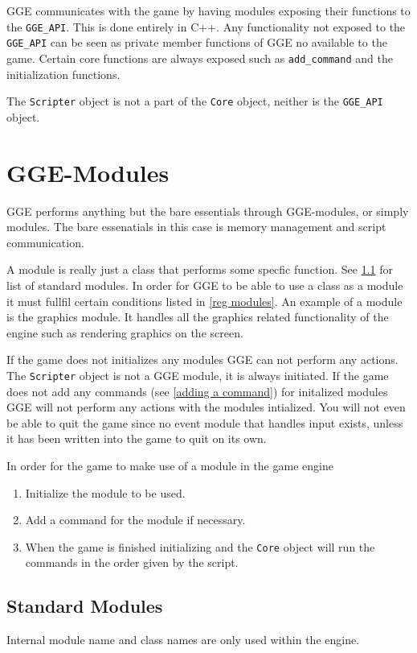GGE communicates with the game by having modules exposing their functions to the \verb|GGE_API|. This is done entirely
in C++. Any functionality not exposed to the \verb|GGE_API| can be seen as private member functions of GGE no
available to the game.
Certain core functions are always exposed such as \verb|add_command| and the initialization functions.

The \verb|Scripter| object is not a part of the \verb|Core| object, neither is the \verb|GGE_API| object.

\section{GGE-Modules} \label{inner modules}
GGE performs anything but the bare essentials through GGE-modules, or simply modules. The bare essenatials in this case is memory management and script communication.

A module is really just a class that performs some specfic function. See \ref{standard modules} for list of standard modules.
In order for GGE to be able to use a class as a module it must fullfil certain conditions listed in \ref{reg modules}.
An example of a module is the graphics module. It handles all the graphics related functionality of the engine such as rendering graphics on the screen.

If the game does not initializes any modules GGE can not perform any actions. The \verb|Scripter| object is not a GGE module, it is always initiated.
If the game does not add any commands (see \ref{adding a command}) for initalized modules GGE will not perform any actions with the modules intialized.
You will not even be able to quit the game since no event module that handles input exists, unless it has been written into the game to quit on its own.


In order for the game to make use of a module in the game engine
\begin{enumerate}
	\item Initialize the module to be used.
	\item Add a command for the module if necessary.
	\item When the game is finished initializing and the \verb|Core| object will run the commands in the order given by the script.
\end{enumerate}

\subsection{Standard Modules} \label{standard modules}
Internal module name and class names are only used within the engine. 

